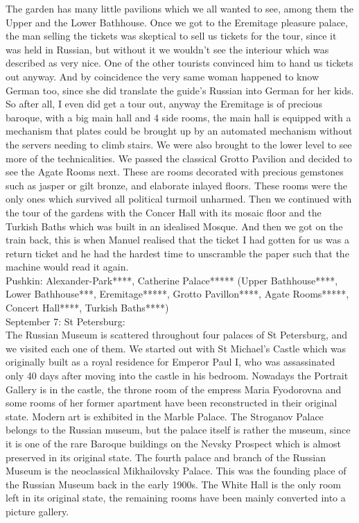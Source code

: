 The garden has many little pavilions which we all wanted to see, among them the Upper and the Lower Bathhouse. Once we got to the Eremitage pleasure palace, the man selling the tickets was skeptical to sell us tickets for the tour, since it was held in Russian, but without it we wouldn't see the interiour which was described as very nice. One of the other tourists convinced him to hand us tickets out anyway. And by coincidence the very same woman happened to know German too, since she did translate the guide's Russian into German for her kids. So after all, I even did get a tour out, anyway the Eremitage is of precious baroque, with a big main hall and 4 side rooms, the main hall is equipped with a mechanism that plates could be brought up by an automated mechanism without the servers needing to climb stairs. We were also brought to the lower level to see more of the technicalities. We passed the classical Grotto Pavilion and decided to see the Agate Rooms next. These are rooms decorated with precious gemstones such as jasper or gilt bronze, and elaborate inlayed floors. These rooms were the only ones which survived all political turmoil unharmed. Then we continued with the tour of the gardens with the Concer Hall with its mosaic floor and the Turkish Baths which was built in an idealised Mosque. And then we got on the train back, this is when Manuel realised that the ticket I had gotten for us was a return ticket and he had the hardest time to unscramble the paper such that the machine would read it again.\\

Pushkin: Alexander-Park****, Catherine Palace***** (Upper Bathhouse****, Lower Bathhouse***, Eremitage*****, Grotto Pavillon****, Agate Rooms*****, Concert Hall****, Turkish Baths****)\\

September 7: St Petersburg:\\
The Russian Museum is scattered throughout four palaces of St Petersburg, and we visited each one of them. We started out with St Michael's Castle which was originally built as a royal residence for Emperor Paul I, who was assassinated only 40 days after moving into the castle in his bedroom. Nowadays the Portrait Gallery is in the castle, the throne room of the empress Maria Fyodorovna and some rooms of her former apartment have been reconstructed in their original state. Modern art is exhibited in the Marble Palace. The Stroganov Palace belongs to the Russian museum, but the palace itself is rather the museum, since it is one of the rare Baroque buildings on the Nevsky Prospect which is almost preserved in its original state. The fourth palace and branch of the Russian Museum is the neoclassical Mikhailovsky Palace. This was the founding place of the Russian Museum back in the early 1900s. The White Hall is the only room left in its original state, the remaining rooms have been mainly converted into a picture gallery.\\

